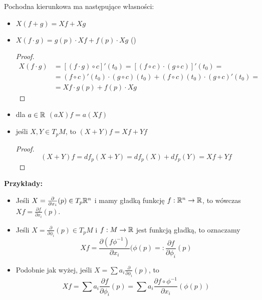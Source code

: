Pochodna kierunkowa ma następujące własności:
\begin{itemize}
  \item $X(f+g)=Xf+Xg$
  \item $X(f\cdot g)=g(p)\cdot Xf+f(p)\cdot Xg$ ()
    \begin{proof}
      \begin{align*}
        X(f\cdot g)&=[(f\cdot g)\circ c]'(t_0)=[(f\circ c)\cdot(g\circ c)]'(t_0)=\\
                            &=(f\circ c)'(t_0)\cdot(g\circ c)(t_0)+(f\circ c)(t_0)\cdot(g\circ c)'(t_0)=\\
                            &=Xf\cdot g(p)+f(p)\cdot Xg
      \end{align*}
    \end{proof}
  \item dla $a\in \mathbb{R}$ $(aX)f=a(Xf)$
  \item jeśli $X, Y\in T_pM$, to $(X+Y)f=Xf+Yf$
    \begin{proof}
      $$(X+Y)f=df_p(X+Y)=df_p(X)+df_p(Y)=Xf+Yf$$
    \end{proof}
\end{itemize}

\textbf{Przykłady:}
\begin{itemize}
  \item {}Jeśli $X=\frac{\partial}{\partial x_i}(p)\in T_p\mathbb{R}^n$ i mamy gładką funkcję $f:\mathbb{R}^n\to\mathbb{R}$, to wówczas $Xf=\frac{\partial f}{\partial x_i}(p)$. 
  \item {}Jeśli $X=\frac{\partial}{\partial\phi_i}(p)\in T_pM$ i $f:M\to\mathbb{R}$ jest funkcją gładką, to oznaczamy 
    $$Xf=\frac{\partial(f\phi^{-1})}{\partial x_i}(\phi(p)=:\frac{\partial f}{\partial \phi_i}(p)$$
  \item Podobnie jak wyżej, jeśli $X=\sum a_i\frac{\partial}{\partial \phi_i}(p)$, to
    $$Xf=\sum a_i\frac{\partial f}{\partial\phi_i}(p)=\sum a_i\frac{\partial f\circ\phi^{-1}}{\partial x_i}(\phi(p))$$
\end{itemize}
